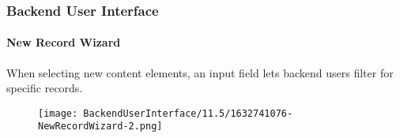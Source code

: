 %

\begin{frame}[fragile]
	\frametitle{Backend User Interface}
	\framesubtitle{New Record Wizard}

	When selecting new content elements, an input field lets backend users filter
	for specific records.

	\begin{figure}
		\texttt{[image: BackendUserInterface/11.5/1632741076-NewRecordWizard-2.png]}
	\end{figure}

\end{frame}

